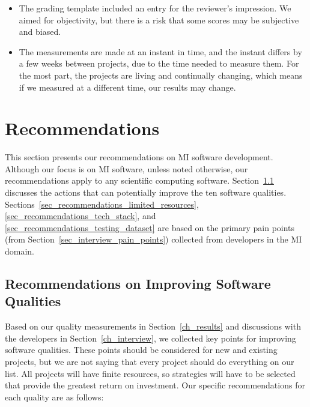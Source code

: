 \documentclass[final, 3p, times, authoryear]{elsarticle}
\begin{document}
\begin{itemize}
\item The grading template included an entry for the reviewer's impression.  We
aimed for objectivity, but there is a risk that some scores may be subjective
and biased.
\item The measurements are made at an instant in time, and the instant differs
by a few weeks between projects, due to the time needed to measure them. For the
most part, the projects are living and continually changing, which means if we
measured at a different time, our results may change.
\end{itemize}

\section{Recommendations} \label{ch_recommendations}

This section presents our recommendations on MI software development. Although
our focus is on MI software, unless noted otherwise, our recommendations apply
to any scientific computing software.
Section~\ref{sec_recommendations_qualities} discusses the actions that can
potentially improve the ten software qualities.
Sections~\ref{sec_recommendations_limited_resources},
\ref{sec_recommendations_tech_stack}, and
\ref{sec_recommendations_testing_dataset} are based on the primary pain points
(from Section~\ref{sec_interview_pain_points}) collected from developers in the
MI domain.

\subsection{Recommendations on Improving Software Qualities}
\label{sec_recommendations_qualities}

Based on our quality measurements in Section~\ref{ch_results} and discussions
with the developers in Section~\ref{ch_interview}, we collected key points for
improving software qualities. These points should be considered for new and
existing projects, but we are not saying that every project should do everything
on our list.  All projects will have finite resources, so strategies will have
to be selected that provide the greatest return on investment.  Our specific
recommendations for each quality are as follows:
\end{document}
